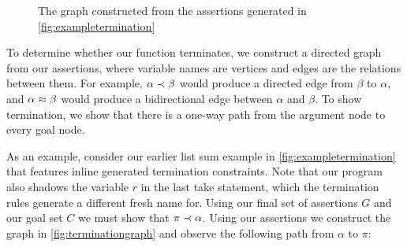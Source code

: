 \begin{figure}
    \centering
    
    \caption{The graph constructed from the assertions generated in \autoref{fig:exampletermination}}
    \label{fig:terminationgraph}
\end{figure}

\FloatBarrier

To determine whether our function terminates, we construct a directed graph from
our assertions, where variable names are vertices and edges are the relations
between them. For example, $\alpha \prec \beta$ would produce a directed edge from
$\beta$ to $\alpha$, and $\alpha \approx \beta$ would produce a bidirectional edge between 
$\alpha$ and $\beta$. To show termination, we show that there is a one-way path
from the argument node to every goal node.

As an example, consider our earlier list sum example in \autoref{fig:exampletermination}
that features inline generated termination constraints. Note that our program also shadows
the variable $r$ in the last \textsf{take} statement, which the termination
rules generate a different fresh name for. Using our final set of assertions
$G$ and our goal set $C$ we must show that $\pi \prec \alpha$.
Using our assertions we construct the graph in \autoref{fig:terminationgraph}
and observe the following path from $\alpha$ to $\pi$:

